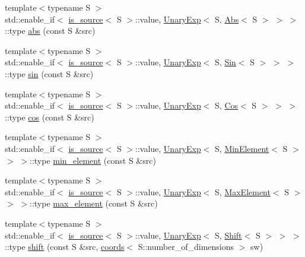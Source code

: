 \begin{DoxyCompactItemize}
{\footnotesize template$<$typename S $>$ }\\std\+::enable\+\_\+if$<$ \hyperlink{classshark_1_1ndim_1_1is__source}{is\+\_\+source}$<$ S $>$\+::value, \hyperlink{classshark_1_1ndim_1_1_unary_exp}{Unary\+Exp}$<$ S, \hyperlink{classshark_1_1ndim_1_1_abs}{Abs}$<$ S $>$ $>$ $>$\+::type \hyperlink{namespaceshark_1_1ndim_a6ec5334c10df1824526954ad5a205531}{abs} (const S \&src)
\item 
{\footnotesize template$<$typename S $>$ }\\std\+::enable\+\_\+if$<$ \hyperlink{classshark_1_1ndim_1_1is__source}{is\+\_\+source}$<$ S $>$\+::value, \hyperlink{classshark_1_1ndim_1_1_unary_exp}{Unary\+Exp}$<$ S, \hyperlink{classshark_1_1ndim_1_1_sin}{Sin}$<$ S $>$ $>$ $>$\+::type \hyperlink{namespaceshark_1_1ndim_ad0b8060a85f85b70899c28e4fb9e7047}{sin} (const S \&src)
\item 
{\footnotesize template$<$typename S $>$ }\\std\+::enable\+\_\+if$<$ \hyperlink{classshark_1_1ndim_1_1is__source}{is\+\_\+source}$<$ S $>$\+::value, \hyperlink{classshark_1_1ndim_1_1_unary_exp}{Unary\+Exp}$<$ S, \hyperlink{classshark_1_1ndim_1_1_cos}{Cos}$<$ S $>$ $>$ $>$\+::type \hyperlink{namespaceshark_1_1ndim_a5dfdad9111c53551d5b4a60d8d68820f}{cos} (const S \&src)
\item 
{\footnotesize template$<$typename S $>$ }\\std\+::enable\+\_\+if$<$ \hyperlink{classshark_1_1ndim_1_1is__source}{is\+\_\+source}$<$ S $>$\+::value, \hyperlink{classshark_1_1ndim_1_1_unary_exp}{Unary\+Exp}$<$ S, \hyperlink{classshark_1_1ndim_1_1_min_element}{Min\+Element}$<$ S $>$ $>$ $>$\+::type \hyperlink{namespaceshark_1_1ndim_a4c389b16fefd6eef118bb0c46fa50379}{min\+\_\+element} (const S \&src)
\item 
{\footnotesize template$<$typename S $>$ }\\std\+::enable\+\_\+if$<$ \hyperlink{classshark_1_1ndim_1_1is__source}{is\+\_\+source}$<$ S $>$\+::value, \hyperlink{classshark_1_1ndim_1_1_unary_exp}{Unary\+Exp}$<$ S, \hyperlink{classshark_1_1ndim_1_1_max_element}{Max\+Element}$<$ S $>$ $>$ $>$\+::type \hyperlink{namespaceshark_1_1ndim_ab3a86aa005a8963555dcb303cfc0e0c9}{max\+\_\+element} (const S \&src)
\item 
{\footnotesize template$<$typename S $>$ }\\std\+::enable\+\_\+if$<$ \hyperlink{classshark_1_1ndim_1_1is__source}{is\+\_\+source}$<$ S $>$\+::value, \hyperlink{classshark_1_1ndim_1_1_unary_exp}{Unary\+Exp}$<$ S, \hyperlink{classshark_1_1ndim_1_1_shift}{Shift}$<$ S $>$ $>$ $>$\+::type \hyperlink{namespaceshark_1_1ndim_a22800ad79a4648e95fe28d89414e950f}{shift} (const S \&src, \hyperlink{structshark_1_1ndim_1_1coords}{coords}$<$ S\+::number\+\_\+of\+\_\+dimensions $>$ sw)

\end{DoxyCompactItemize}
